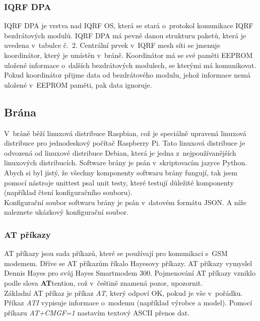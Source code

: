 \documentclass[12pt,a4paper,oneside]{article}
\begin{document}
\subsubsection{IQRF DPA}

IQRF DPA je vrstva nad IQRF OS, která se stará o~protokol komunikace IQRF bezdrátových modulů. IQRF DPA má pevně danou strukturu paketů, která je uvedena v~tabulce č.~2. Centrální prvek v~IQRF mesh síti se jmenuje koordinátor, který je umístěn v~bráně. Koordinátor má se své paměti EEPROM uložené informace o~dalších bezdrátových modulech, se kterými má komunikovat. Pokud koordinátor přijme data od bezdrátového modulu, jehož informace nemá uložené v~EEPROM paměti, pak data ignoruje.

\subsection{Brána}

V~bráně běží linuxová distribuce Raspbian, což je speciálně upravená linuxová distribuce pro jednodeskový počítač Raspberry Pi. Tato linuxová distribuce je odvozená od linuxové distribuce Debian, která je jedna z~nejpoužívanějších linuxových distribucích. Software brány je psán v~skriptovacím jazyce Python. Abych si byl jistý, že všechny komponenty softwaru brány fungují, tak jsem pomocí nástroje unittest psal unit testy, které testují důležité komponenty (například čtení konfiguračního souboru). \\

Konfigurační soubor softwaru brány je psán v~datovém formátu JSON. A níže naleznete ukázkový konfigurační soubor.

\subsubsection{AT příkazy}

AT příkazy jsou sada příkazů, které se používají pro komunikaci s~GSM modemem. Dříve se AT příkazům říkalo Hayesovy příkazy. AT příkazy vymyslel Dennis Hayes pro svůj Hayes Smartmodem 300. Pojmenování AT příkazy vzniklo podle slova \textbf{AT}tention, což v~češtině znamená pozor, upozornit. \\

Základní AT příkaz je příkaz \textit{AT}, který odpoví OK, pokud je vše v~pořádku. Příkaz \textit{ATI} vypisuje informace o~modemu (například výrobce a model). Pomocí příkazu \textit{AT+CMGF=1} nastavím textový ASCII přenos dat. \\
\end{document}
